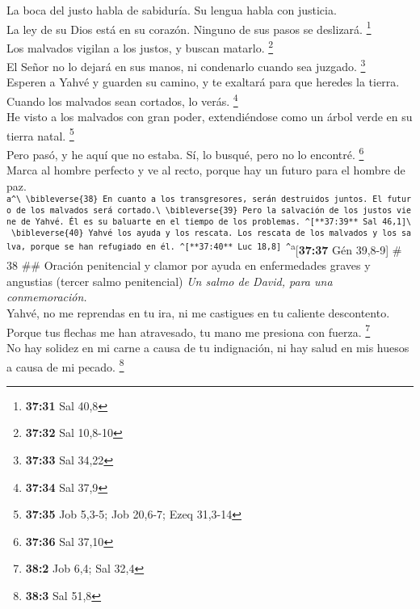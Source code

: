  La boca del justo habla de sabiduría. Su lengua habla
con justicia.\\
 La ley de su Dios está en su corazón. Ninguno de sus
pasos se deslizará. \footnote{\textbf{37:31} Sal 40,8}\\
 Los malvados vigilan a los justos, y buscan matarlo.
\footnote{\textbf{37:32} Sal 10,8-10}\\
 El Señor no lo dejará en sus manos, ni condenarlo cuando
sea juzgado. \footnote{\textbf{37:33} Sal 34,22}\\
 Esperen a Yahvé y guarden su camino, y te exaltará para
que heredes la tierra. Cuando los malvados sean cortados, lo verás.
\footnote{\textbf{37:34} Sal 37,9}\\
 He visto a los malvados con gran poder, extendiéndose
como un árbol verde en su tierra natal. \footnote{\textbf{37:35} Job
  5,3-5; Job 20,6-7; Ezeq 31,3-14}\\
 Pero pasó, y he aquí que no estaba. Sí, lo busqué, pero
no lo encontré. \footnote{\textbf{37:36} Sal 37,10}\\
 Marca al hombre perfecto y ve al recto, porque hay un
futuro para el hombre de paz.
\textsuperscript{\texttt{a\^{}\textbackslash{}\ \textbackslash{}bibleverse\{38\}\ En\ cuanto\ a\ los\ transgresores,\ serán\ destruidos\ juntos.\ El\ futuro\ de\ los\ malvados\ será\ cortado.\textbackslash{}\ \textbackslash{}bibleverse\{39\}\ Pero\ la\ salvación\ de\ los\ justos\ viene\ de\ Yahvé.\ Él\ es\ su\ baluarte\ en\ el\ tiempo\ de\ los\ problemas.\ \^{}{[}**37:39**\ Sal\ 46,1{]}\textbackslash{}\ \textbackslash{}bibleverse\{40\}\ Yahvé\ los\ ayuda\ y\ los\ rescata.\ Los\ rescata\ de\ los\ malvados\ y\ los\ salva,\ porque\ se\ han\ refugiado\ en\ él.\ \^{}{[}**37:40**\ Luc\ 18,8{]}\ \^{}}a}{[}\textbf{37:37}
Gén 39,8-9{]} \# 38 \#\# Oración penitencial y clamor por ayuda en
enfermedades graves y angustias (tercer salmo penitencial) \emph{Un
salmo de David, para una conmemoración.}\\
 Yahvé, no me reprendas en tu ira, ni me castigues en tu
caliente descontento.\\
 Porque tus flechas me han atravesado, tu mano me presiona
con fuerza. \footnote{\textbf{38:2} Job 6,4; Sal 32,4}\\
 No hay solidez en mi carne a causa de tu indignación, ni
hay salud en mis huesos a causa de mi pecado. \footnote{\textbf{38:3}
  Sal 51,8}\\
